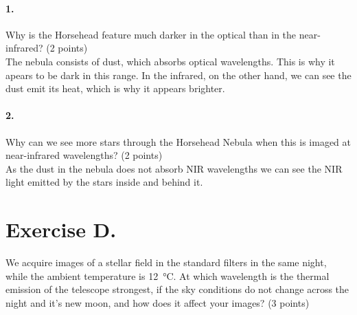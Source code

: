 \documentclass[11pt,a4paper,twoside]{article}
\begin{document}
\paragraph{1.} Why is the Horsehead feature much darker in the optical than in
the near-infrared? (2 points)  \\

The nebula consists of dust, which absorbs optical wavelengths. This is why it
apears to be dark in this range.
In the infrared, on the other hand, we can see the dust emit its heat, which is
why it appears brighter. 

\paragraph{2.} Why can we see more stars through the Horsehead Nebula when this
is imaged at near-infrared wavelengths? (2 points) \\

As the dust in the nebula does not absorb NIR wavelengths we can see the NIR 
light emitted by the stars inside and behind it.




%
%
%


\section*{Exercise D.}

We acquire images of a stellar field in the standard filters in the same night,
while the ambient temperature is \SI{12}{\celsius}. At which wavelength is the
thermal emission of the telescope strongest, if the sky conditions do not
change across the night and it's new moon, and how does it affect your images?
(3 points) \\
\end{document}

